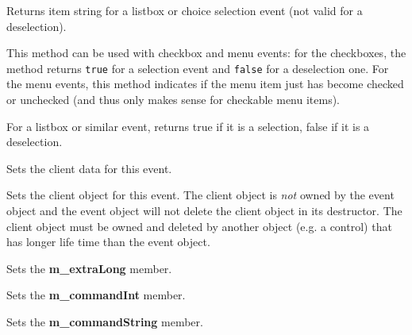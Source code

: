 
Returns item string for a listbox or choice selection event (not valid for
a deselection).

\label{wxcommandeventischecked}


This method can be used with checkbox and menu events: for the checkboxes, the
method returns {\tt true} for a selection event and {\tt false} for a
deselection one. For the menu events, this method indicates if the menu item
just has become checked or unchecked (and thus only makes sense for checkable
menu items).

\label{wxcommandeventisselection}


For a listbox or similar event, returns true if it is a selection, false if it
is a deselection.

\label{wxcommandeventsetclientdata}


Sets the client data for this event.

\label{wxcommandeventsetclientobject}


Sets the client object for this event. The client object is \emph{not} owned by the event
object and the event object will not delete the client object in its destructor.
The client object must be owned and deleted by another object (e.g. a control)
that has longer life time than the event object.

\label{wxcommandeventsetextralong}


Sets the {\bf m\_extraLong} member.

\label{wxcommandeventsetint}


Sets the {\bf m\_commandInt} member.

\label{wxcommandeventsetstring}


Sets the {\bf m\_commandString} member.

